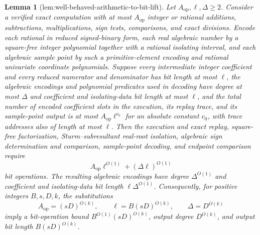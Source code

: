 \documentclass{article}
\newtheorem{lemma}{Lemma}
\begin{document}
\begin{lemma}[lem:well-behaved-arithmetic-to-bit-lift]\label{lem:well-behaved-arithmetic-to-bit-lift}
Let \(A_{\mathrm{op}},\ell,\Delta\ge 2\).  Consider a verified exact computation with at most \(A_{\mathrm{op}}\) integer or rational additions, subtractions, multiplications, sign tests, comparisons, and exact divisions.  Encode each rational in reduced signed-binary form, each real algebraic number by a square-free integer polynomial together with a rational isolating interval, and each algebraic sample point by such a primitive-element encoding and rational univariate coordinate polynomials.  Suppose every intermediate integer coefficient and every reduced numerator and denominator has bit length at most \(\ell\), the algebraic encodings and polynomial predicates used in decoding have degree at most \(\Delta\) and coefficient and isolating-data bit length at most \(\ell\), and the total number of encoded coefficient slots in the execution, its replay trace, and its sample-point output is at most \(A_{\mathrm{op}}\ell^{c_0}\) for an absolute constant \(c_0\), with trace addresses also of length at most \(\ell\).  Then the execution and exact replay, square-free factorization, Sturm--subresultant real-root isolation, algebraic sign determination and comparison, sample-point decoding, and endpoint comparison require
\[
A_{\mathrm{op}}\ell^{O(1)}+(\Delta\ell)^{O(1)}
\]
bit operations.  The resulting algebraic encodings have degree \(\Delta^{O(1)}\) and coefficient and isolating-data bit length \(\ell\Delta^{O(1)}\).  Consequently, for positive integers \(B,s,D,k\), the substitutions
\[
A_{\mathrm{op}}=(sD)^{O(k)},\qquad
\ell=B(sD)^{O(k)},\qquad
\Delta=D^{O(k)}
\]
imply a bit-operation bound \(B^{O(1)}(sD)^{O(k)}\), output degree \(D^{O(k)}\), and output bit length \(B(sD)^{O(k)}\).
\end{lemma}
\end{document}

